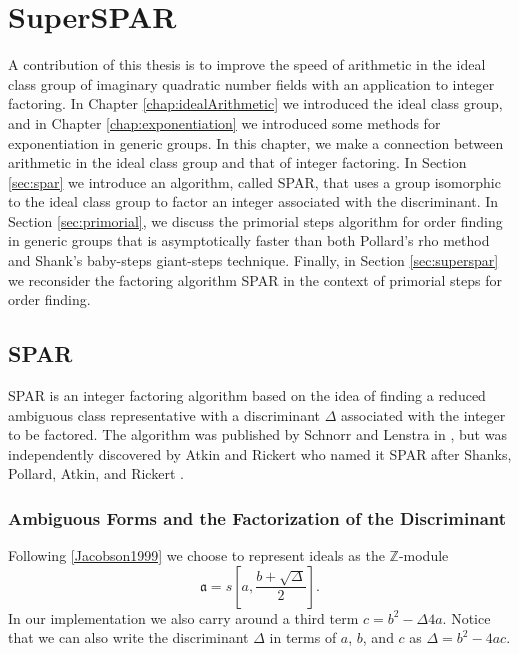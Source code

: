 \documentclass{ucalgthes1}
\theoremstyle{plain}
\theoremstyle{definition}
\newcommand{\ZZ}{\mathbb{Z}}
\begin{document}
\setcounter{chapter}{3}
\chapter{SuperSPAR}
\label{chap:superspar}

A contribution of this thesis is to improve the speed of arithmetic in the ideal class group of imaginary quadratic number fields with an application to integer factoring.  In Chapter \ref{chap:idealArithmetic} we introduced the ideal class group, and in Chapter \ref{chap:exponentiation} we introduced some methods for exponentiation in generic groups.  In this chapter, we make a connection between arithmetic in the ideal class group and that of integer factoring.  In Section \ref{sec:spar} we introduce an algorithm, called SPAR, that uses a group isomorphic to the ideal class group to factor an integer associated with the discriminant.  In Section \ref{sec:primorial}, we discuss the primorial steps algorithm for order finding in generic groups that is asymptotically faster than both Pollard's rho method and Shank's baby-steps giant-steps technique.  Finally, in Section \ref{sec:superspar} we reconsider the factoring algorithm SPAR in the context of primorial steps for order finding.

\section{SPAR}

SPAR is an integer factoring algorithm based on the idea of finding a reduced ambiguous class representative with a discriminant $\Delta$ associated with the integer to be factored.  The algorithm was published by Schnorr and Lenstra in \cite{Schnorr1984}, but was independently discovered by Atkin and Rickert who named it SPAR after Shanks, Pollard, Atkin, and Rickert \cite[p.182]{Jacobson1999}.

\subsection{Ambiguous Forms and the Factorization of the Discriminant}

Following \ref{Jacobson1999} we choose to represent ideals as the $\ZZ$-module
\[
	\mathfrak a = s \left[a, \frac{b + \sqrt\Delta}{2} \right].
\]
In our implementation we also carry around a third term $c = {b^2 - \Delta}{4a}$.  Notice that we can also write the discriminant $\Delta$ in terms of $a$, $b$, and $c$ as $\Delta = b^2 - 4ac$. 
\end{document}
